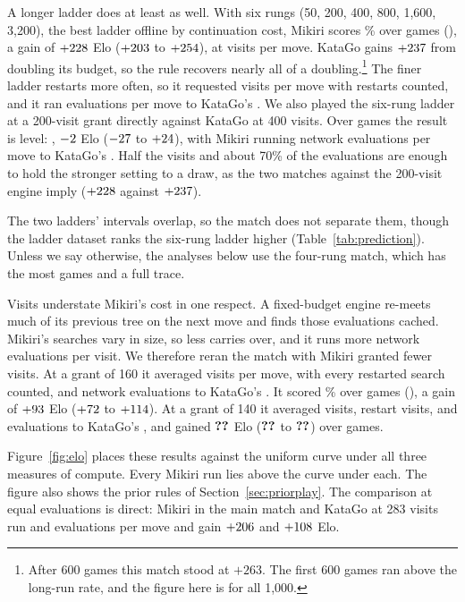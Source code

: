 A longer ladder does at least as well. With six rungs (50, 200, 400, 800, 1{,}600, 3{,}200), the best ladder offline by continuation cost, Mikiri scores \longScore\% over \longGames{} games (\longRecord), a gain of $+228$ Elo ($+203$ to $+254$), at \longVisits{} visits per move. KataGo gains $+237$ from doubling its budget, so the rule recovers nearly all of a doubling.\footnote{After 600 games this match stood at $+263$. The first 600 games ran above the long-run rate, and the figure here is for all 1{,}000.} The finer ladder restarts more often, so it requested \longRestart{} visits per move with restarts counted, and it ran \longEvals{} evaluations per move to KataGo's \longBaseEvals. We also played the six-rung ladder at a 200-visit grant directly against KataGo at 400 visits. Over \halfGames{} games the result is level: \halfRecord, $-2$ Elo ($-27$ to $+24$), with Mikiri running \halfEvals{} network evaluations per move to KataGo's \halfBaseEvals. Half the visits and about 70\% of the evaluations are enough to hold the stronger setting to a draw, as the two matches against the 200-visit engine imply ($+228$ against $+237$).

The two ladders' intervals overlap, so the match does not separate them, though the ladder dataset ranks the six-rung ladder higher (Table~\ref{tab:prediction}). Unless we say otherwise, the analyses below use the four-rung match, which has the most games and a full trace.

Visits understate Mikiri's cost in one respect. A fixed-budget engine re-meets much of its previous tree on the next move and finds those evaluations cached. Mikiri's searches vary in size, so less carries over, and it runs more network evaluations per visit. We therefore reran the match with Mikiri granted fewer visits. At a grant of 160 it averaged \strictVisits{} visits per move, \strictRestart{} with every restarted search counted, and \strictEvals{} network evaluations to KataGo's \strictBaseEvals. It scored \strictScore\% over \strictGames{} games (\strictRecord), a gain of $+93$ Elo ($+72$ to $+114$). At a grant of 140 it averaged \leanVisits{} visits, \leanRestart{} restart visits, and \leanEvals{} evaluations to KataGo's \leanBaseEvals, and gained $\textbf{??}$ Elo ($\textbf{??}$ to $\textbf{??}$) over \leanGames{} games.

Figure~\ref{fig:elo} places these results against the uniform curve under all three measures of compute. Every Mikiri run lies above the curve under each. The figure also shows the prior rules of Section~\ref{sec:priorplay}. The comparison at equal evaluations is direct: Mikiri in the main match and KataGo at 283 visits run \mainEvals{} and \unirootEvals{} evaluations per move and gain $+206$ and $+108$ Elo.

